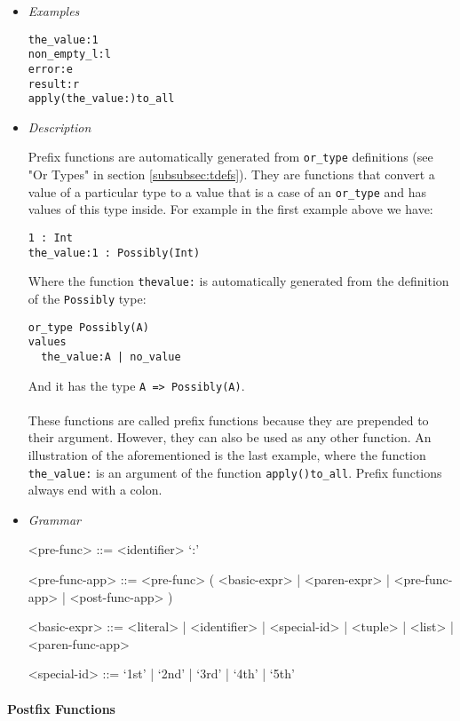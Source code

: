 \documentclass{article}
\begin{document}
\begin{itemize}

\item \textit{Examples}
\begin{verbatim}
the_value:1
non_empty_l:l
error:e
result:r
apply(the_value:)to_all
\end{verbatim}

\item \textit{Description}

Prefix functions are automatically generated from \texttt{or_type} definitions
(see "Or Types" in section \ref{subsubsec:tdefs}). They are functions that
convert a value of a particular type to a value that is a case of an
\texttt{or_type} and has values of this type inside. For example in the
first example above we have:
\begin{verbatim}
1 : Int
the_value:1 : Possibly(Int)
\end{verbatim}
Where the function \texttt{thevalue:} is automatically generated from the
definition of the \texttt{Possibly} type:
\begin{verbatim}
or_type Possibly(A)
values
  the_value:A | no_value
\end{verbatim}
And it has the type \texttt{A => Possibly(A)}.
\\\\
These functions are called prefix functions because they are prepended to
their argument. However, they can also be used as any other function.
An illustration of the aforementioned is the last example, where the function
\texttt{the_value:} is an argument of the function \texttt{apply()to_all}.
Prefix functions always end with a colon.

\item \textit{Grammar}
\begin{grammar}
<pre-func> ::= <identifier> `:'

<pre-func-app> ::=
<pre-func> ( <basic-expr> | <paren-expr> | <pre-func-app> | <post-func-app> )

<basic-expr> ::=
<literal> | <identifier> | <special-id> | <tuple> | <list> | <paren-func-app>

<special-id> ::= `1st' | `2nd' | `3rd' | `4th' | `5th'
\end{grammar}

\end{itemize}

\paragraph{Postfix Functions}
\end{document}

